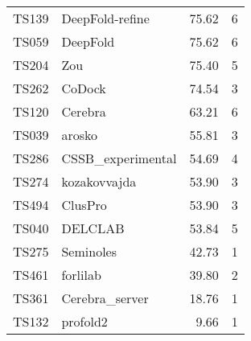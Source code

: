 \begin{table}[ht]
{\begin{tabular}{llrr}
TS139 & DeepFold-refine & 75.62 & 6 \\ 
TS059 & DeepFold & 75.62 & 6 \\ 
TS204 & Zou & 75.40 & 5 \\ 
TS262 & CoDock & 74.54 & 3 \\ 
TS120 & Cerebra & 63.21 & 6 \\ 
TS039 & arosko & 55.81 & 3 \\ 
TS286 & CSSB\_experimental & 54.69 & 4 \\ 
TS274 & kozakovvajda & 53.90 & 3 \\ 
TS494 & ClusPro & 53.90 & 3 \\ 
TS040 & DELCLAB & 53.84 & 5 \\ 
TS275 & Seminoles & 42.73 & 1 \\ 
TS461 & forlilab & 39.80 & 2 \\ 
TS361 & Cerebra\_server & 18.76 & 1 \\ 
TS132 & profold2 & 9.66 & 1 \\ 
\bottomrule
\end{tabular}%
}
\end{table}
